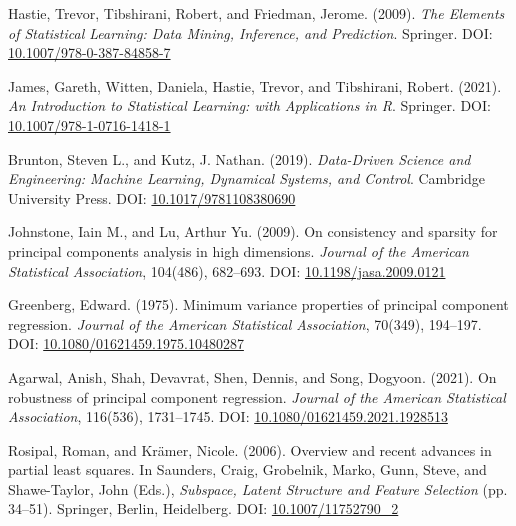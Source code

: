 \documentclass[11pt,twoside,a4paper]{article}
\begin{document}
\newpage
\renewcommand\refname {\section {Bibliography}}

\begin{thebibliography}{99}

Hastie, Trevor, Tibshirani, Robert, and Friedman, Jerome. (2009). \textit{The Elements of Statistical Learning: Data Mining, Inference, and Prediction}. Springer. DOI: \href{https://doi.org/10.1007/978-0-387-84858-7}{10.1007/978-0-387-84858-7}

James, Gareth, Witten, Daniela, Hastie, Trevor, and Tibshirani, Robert. (2021). \textit{An Introduction to Statistical Learning: with Applications in R}. Springer. DOI: \href{https://doi.org/10.1007/978-1-0716-1418-1}{10.1007/978-1-0716-1418-1}

Brunton, Steven L., and Kutz, J. Nathan. (2019). \textit{Data-Driven Science and Engineering: Machine Learning, Dynamical Systems, and Control}. Cambridge University Press. DOI: \href{https://doi.org/10.1017/9781108380690}{10.1017/9781108380690}

Johnstone, Iain M., and Lu, Arthur Yu. (2009). On consistency and sparsity for principal components analysis in high dimensions. \textit{Journal of the American Statistical Association}, 104(486), 682–693. DOI: \href{https://doi.org/10.1198/jasa.2009.0121}{10.1198/jasa.2009.0121}

Greenberg, Edward. (1975). Minimum variance properties of principal component regression. \textit{Journal of the American Statistical Association}, 70(349), 194–197. DOI: \href{https://doi.org/10.1080/01621459.1975.10480287}{10.1080/01621459.1975.10480287}

Agarwal, Anish, Shah, Devavrat, Shen, Dennis, and Song, Dogyoon. (2021). On robustness of principal component regression. \textit{Journal of the American Statistical Association}, 116(536), 1731–1745. DOI: \href{https://doi.org/10.1080/01621459.2021.1928513}{10.1080/01621459.2021.1928513}

Rosipal, Roman, and Krämer, Nicole. (2006). Overview and recent advances in partial least squares. In Saunders, Craig, Grobelnik, Marko, Gunn, Steve, and Shawe-Taylor, John (Eds.), \textit{Subspace, Latent Structure and Feature Selection} (pp. 34–51). Springer, Berlin, Heidelberg. DOI: \href{https://doi.org/10.1007/11752790_2}{10.1007/11752790\_2}


\end{thebibliography}
\end{document}
